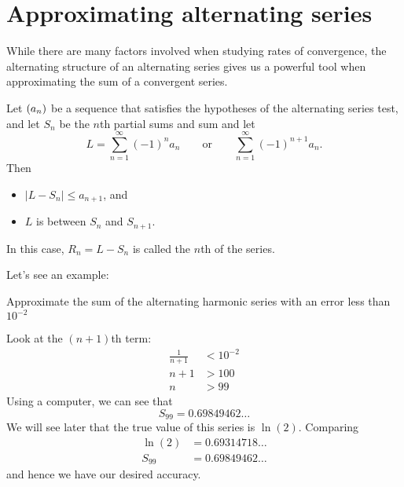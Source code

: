 \documentclass{ximera}
\begin{document}
\section{Approximating alternating series}


While there are many factors involved when studying rates of
convergence, the alternating structure of an alternating series gives
us a powerful tool when approximating the sum of a convergent series.

\begin{theorem}
Let $\left( a_n \right)$ be a sequence that satisfies the hypotheses of the
alternating series test, and let $S_n$ be the $n$th partial sums and
sum and let 
\[
L = \sum_{n=1}^\infty (-1)^{n}a_n\qquad\text{or}\qquad\sum_{n=1}^\infty (-1)^{n+1}a_n.
\]
Then
\begin{itemize}
\item $|L-S_n| \leq a_{n+1}$, and
\item $L$ is between $S_n$ and $S_{n+1}$.
\end{itemize}
In this case, $R_n=L-S_n$ is called the $n$th  of the
series.
\end{theorem}

Let's see an example:

\begin{example}
Approximate the sum of the alternating harmonic series with an error less than $10^{-2}$
\begin{explanation}
  Look at the $(n+1)$th term:
	\begin{align*}
	\frac{1}{n+1} &< 10^{-2}\\
	n+1&> 100\\
	n&> 99 
	\end{align*}
	Using a computer, we can see that
        \[
        S_{99} = 0.69849462\dots
        \]
        We will see later that the true value of this series is $\ln(2)$. Comparing
        \begin{align*}
          \ln(2) &= 0.69314718\dots\\
          S_{99} &= 0.69849462\dots
        \end{align*}
        and hence we have our desired accuracy.
\end{explanation}
\end{example}

\end{document}
